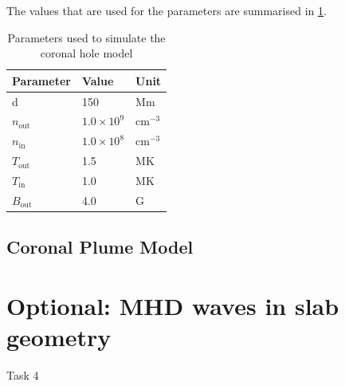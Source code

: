\documentclass{article}
\begin{document}
The values that are used for the parameters are summarised in \cref{tab:coronal_hole}.
\begin{table}[H]
    \centering
    \caption{Parameters used to simulate the coronal hole model}
    \label{tab:coronal_hole}
    \begin{tabular}{|l|l|l|}
    \hline
    \textbf{Parameter}             & \textbf{Value}                                  & \textbf{Unit}              \\ \hline
    d                              & 150                                             & Mm                         \\ \hline
    $n_\text{out}$ & $1.0 \times 10^9$ & $\text{cm}^{-3}$ \\ \hline
    $n_\text{in}$                              & $1.0 \times 10^8$                                               & $\text{cm}^{-3}$                          \\ \hline
    $T_\text{out}$                              & 1.5                                               & MK                          \\ \hline
    $T_\text{in}$                              & 1.0                                               & MK                          \\ \hline
    $B_\text{out}$                              & 4.0                                               & G                          \\ \hline
\end{tabular}
\end{table}
\subsection{Coronal Plume Model} 
\section{Optional: MHD waves in slab geometry}
Task 4
\printbibliography
\end{document}
